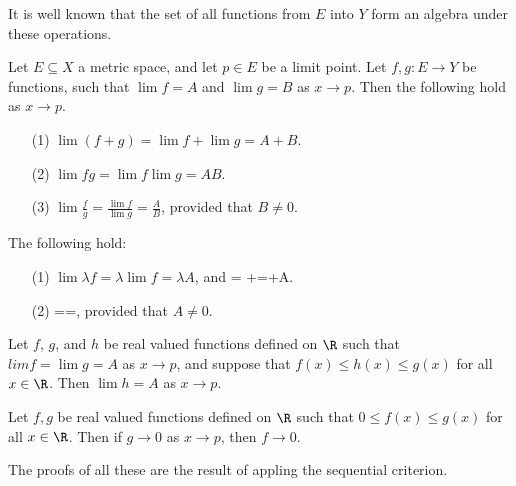 It is well known that the set of all functions from $E$ into  $Y$ form an algebra under
these operations.

 \begin{theorem}\label{5.1.2}
     Let $E \subseteq X$ a metric space, and let $p \in E$ be a limit point. Let $f,g:E \rightarrow Y$
     be functions, such that $\lim{f}=A$ and $\lim{g}=B$ as $x \rightarrow p$. Then the following
     hold as $x \rightarrow p$.
        \begin{enumerate}
            \item[(1)] $\lim{(f+g)}=\lim{f}+\lim{g}=A+B$.

            \item[(2)] $\lim{fg}=\lim{f}\lim{g}=AB$.

            \item[(3)] $\lim{\frac{f}{g}}=\frac{\lim{f}}{\lim{g}}=\frac{A}{B}$, provided that
                $B \neq 0$.
        \end{enumerate}
\end{theorem}

\begin{corollary}
    The following hold:\
        \begin{enumerate}
            \item[(1)] $\lim{\lambda f}=\lambda{}=\lambda A$, and =
                \lambda+\lim{f}=\lambda+A.

            \item[(2)] ==, provided that $A \neq 0$.

        \end{enumerate}
\end{corollary}

\begin{theorem}\label{5.1.3}
    Let $f$, $g$, and  $h$ be real valued functions defined on $\R$ such that
    $lim{f}=\lim{g}=A$ as  $x \rightarrow p$, and suppose that  $f(x) \leq h(x)
    \leq g(x)$ for all  $x \in \R$. Then $\lim{h}=A$ as  $x \rightarrow p$.
\end{theorem}

\begin{corollary}
    Let $f,g$ be real valued functions defined on  $\R$ such that  $0 \leq f(x) \leq g(x)$
    for all $x \in \R$. Then if  $g \rightarrow 0$ as  $x \rightarrow p$, then  $f \rightarrow 0$.
\end{corollary}

The proofs of all these are the result of appling the sequential criterion.
